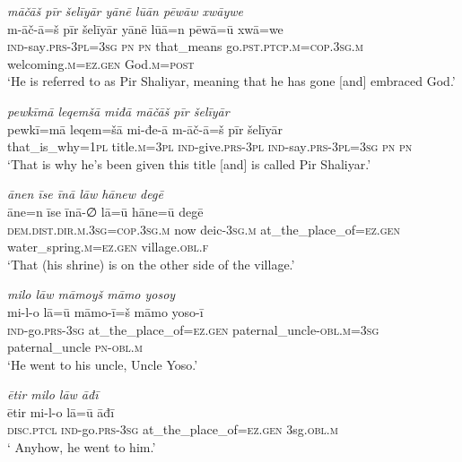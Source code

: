 \ea \label{ŽP.3}
\textit{māčāš pīr šelīyār yānē lūān pēwāw xwāywe} \\ 
\gll m-āč-ā=š pīr šelīyār yānē lūā=n pēwā=ū xwā=we \\ 
 \textsc{ind-}say\textsc{.prs}\textsc{-3pl}\textsc{=3sg} \textsc{pn} \textsc{pn} that\_means go\textsc{.pst}\textsc{.ptcp}\textsc{.m}\textsc{=cop}\textsc{.3sg}\textsc{.m} welcoming\textsc{.m}\textsc{\textsc{=ez.gen}} God\textsc{.m}\textsc{=\textsc{post}} \\ 
\glt `He is referred to as Pir Shaliyar, meaning that he has gone [and] embraced God.'
\z 
 
\ea \label{ŽP.4}
\textit{pewkīmā leqemšā miđā māčāš pīr šelīyār} \\ 
\gll pewkī=mā leqem=šā mi-đe-ā m-āč-ā=š pīr šelīyār \\ 
 that\_is\_why\textsc{=1pl} title\textsc{.m}\textsc{=3pl} \textsc{ind-}give\textsc{.prs}\textsc{-3pl} \textsc{ind-}say\textsc{.prs}\textsc{-3pl}\textsc{=3sg} \textsc{pn} \textsc{pn} \\ 
\glt `That is why he’s been given this title [and] is called Pir Shaliyar.'
\z 
 
\ea \label{ŽP.6}
\textit{ānen īse īnā lāw hānew degē} \\ 
\gll āne=n īse īnā-∅ lā=ū hāne=ū degē \\ 
 \textsc{dem.dist}\textsc{.dir}\textsc{.m}\textsc{.3sg}\textsc{=cop}\textsc{.3sg}\textsc{.m} now deic\textsc{-3sg}\textsc{.m} at\_the\_place\_of\textsc{\textsc{=ez.gen}} water\_spring\textsc{.m}\textsc{\textsc{=ez.gen}} village\textsc{.obl}\textsc{.f} \\ 
\glt `That (his shrine) is on the other side of the village.'
\z 
 
\ea \label{ŽP.11}
\textit{milo lāw māmoyš māmo yosoy} \\ 
\gll mi-l-o lā=ū māmo-ī=š māmo yoso-ī \\ 
 \textsc{ind-}go\textsc{.prs}\textsc{-3sg} at\_the\_place\_of\textsc{\textsc{=ez.gen}} paternal\_uncle\textsc{-obl}\textsc{.m}\textsc{=3sg} paternal\_uncle \textsc{pn}\textsc{-obl}\textsc{.m} \\ 
\glt `He went to his uncle, Uncle Yoso.'
\z 
 
\ea \label{ŽP.13}
\textit{ētir milo lāw āđī} \\ 
\gll ētir mi-l-o lā=ū āđī \\ 
 \textsc{disc.ptcl} \textsc{ind-}go\textsc{.prs}\textsc{-3sg} at\_the\_place\_of\textsc{\textsc{=ez.gen}} 3sg\textsc{.obl}\textsc{.m} \\ 
\glt ` Anyhow, he went to him.'
\z 
 
